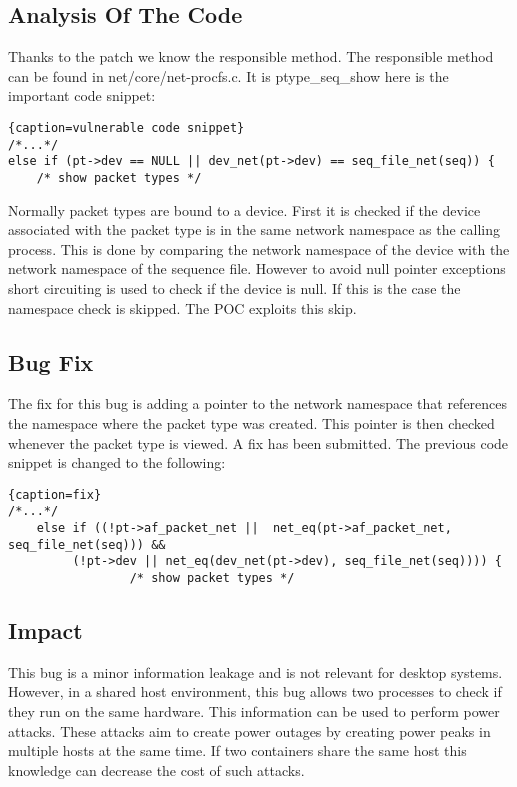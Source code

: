 \documentclass[10pt,twocolumn,a4paper]{article}
\begin{document}
\subsection{Analysis Of The Code}
Thanks to the patch we know the responsible method.
The responsible method can be found in net/core/net-procfs.c. It is ptype\_seq\_show
here is the important code snippet:
\begin{lstlisting}{caption=vulnerable code snippet}
/*...*/
else if (pt->dev == NULL || dev_net(pt->dev) == seq_file_net(seq)) {
    /* show packet types */
\end{lstlisting}
Normally packet types are bound to a device. 
First it is checked if the device associated with the packet type is in the same network namespace as the calling process.
This is done by comparing the network namespace of the device with the network namespace of the sequence file.
However to avoid null pointer exceptions short circuiting is used to check if the device is null. 
If this is the case the namespace check is skipped. The POC exploits this skip.

\subsection{Bug Fix}
The fix for this bug is adding a pointer to the network namespace that references the namespace where the packet type was created.
This pointer is then checked whenever the packet type is viewed.
A fix has been submitted.\cite{4}
The previous code snippet is changed to the following:
\begin{lstlisting}{caption=fix}
/*...*/
	else if ((!pt->af_packet_net ||  net_eq(pt->af_packet_net, seq_file_net(seq))) &&
		 (!pt->dev || net_eq(dev_net(pt->dev), seq_file_net(seq)))) {
                 /* show packet types */
\end{lstlisting}
\cite{4}
\subsection{Impact}
This bug is a minor information leakage and is not relevant for desktop systems.
However, in a shared host environment, this bug allows two processes to check if they run on the same
hardware.
This information can be used to perform power attacks. 
These attacks aim to create power outages by creating power peaks in multiple hosts at the same time.
If two containers share the same host this knowledge can decrease the cost of such attacks\cite{7}.
\end{document}
